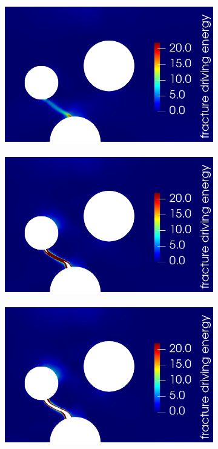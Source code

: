 \begin{figure}[!htb]
    \begin{subfigure}{0.23\textwidth}
        \includegraphics[width=\textwidth,scale=0.5]{prelim/figures/model_2_total_1.png}
        \caption{}
    \end{subfigure}
    \hspace{0.05\textwidth}
    \begin{subfigure}{0.23\textwidth}
        \includegraphics[width=\textwidth,scale=0.5]{prelim/figures/model_2_total_2.png}
        \caption{}
    \end{subfigure}
    \hspace{0.05\textwidth}
    \begin{subfigure}{0.23\textwidth}
        \includegraphics[width=\textwidth,scale=0.5]{prelim/figures/model_2_total_3.png}

\end{subfigure}
\end{figure}
